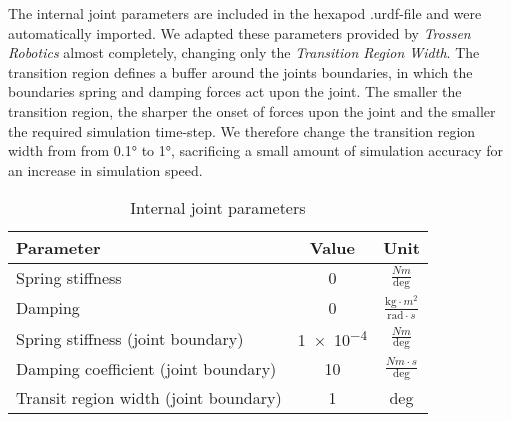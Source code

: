The internal joint parameters are included in the hexapod .urdf-file and were automatically imported.
We adapted these parameters provided by \textit{Trossen Robotics} \parencite{interboticsGithub} almost completely, changing only the \textit{Transition Region Width}.
The transition region defines a buffer around the joints boundaries, in which the boundaries spring and damping forces act upon the joint.
The smaller the transition region, the sharper the onset of forces upon the joint and the smaller the required simulation time-step.
We  therefore change the transition region width from  from 0.1° to 1°, sacrificing a small amount of simulation accuracy for an increase in simulation speed.

{\def\arraystretch{1.4}\tabcolsep=5pt
	\begin{table}[!h]
		\centering
		\begin{tabular}{| l | c | c |}
			\hline
			\textbf{Parameter} & \textbf{Value} & \textbf{Unit}\\
			\hline
			\hline
			Spring stiffness & 0 & $\frac{Nm}{\text{deg}}$\\
			
			Damping & 0 &  $\frac{\text{kg} \cdot m^2}{\text{rad} \cdot s}$\\
			
			Spring stiffness (joint boundary) & \num{1e-4} & $\frac{Nm}{\text{deg}}$ \\
			
			Damping coefficient (joint boundary) &  10 & $\frac{Nm \cdot s}{\text{deg}}$\\
			
			Transit region width (joint boundary) & 1 &  deg\\
			\hline
		\end{tabular}
		
		\caption{Internal joint parameters}
		\label{table: Joint parameters}
	\end{table}
}

